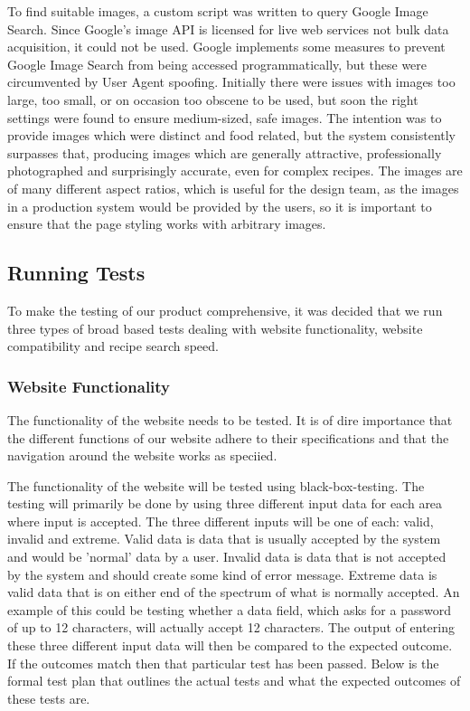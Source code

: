 To find suitable images, a custom script was written to query Google Image Search. Since Google's image API is licensed for live web services not bulk data acquisition, it could not be used. Google implements some measures to prevent Google Image Search from being accessed programmatically, but these were circumvented by User Agent spoofing. Initially there were issues with images too large, too small, or on occasion too obscene to be used, but soon the right settings were found to ensure medium-sized, safe images. The intention was to provide images which were distinct and food related, but the system consistently surpasses that, producing images which are generally attractive, professionally photographed and surprisingly accurate, even for complex recipes. The images are of many different aspect ratios, which is useful for the design team, as the images in a production system would be provided by the users, so it is important to ensure that the page styling works with arbitrary images.



\subsection{Running Tests}                                      %
To make the testing of our product comprehensive, it was decided that we run three types of broad based tests dealing with website functionality, website compatibility and recipe search speed. 

\subsubsection{Website Functionality}
The functionality of the website needs to be tested. It is of dire importance that the different functions of our website adhere to their specifications and that the navigation around the website works as speciied. 

The functionality of the website will be tested using black-box-testing. The testing will primarily be done by using three different input data for each area where input is accepted. The three different inputs will be one of each: valid, invalid and extreme.
Valid data is data that is usually accepted by the system and would be 'normal' data by a user. Invalid data is data that is not accepted by the system and should create some kind of error message. Extreme data is valid data that is on either end of the spectrum of what is normally accepted. An example of this could be testing whether a data field, which asks for a password of up to 12 characters, will actually accept 12 characters. The output of entering these three different input data will then be compared to the expected outcome. If the outcomes match then that particular test has been passed. Below is the formal test plan that outlines the actual tests and what the expected outcomes of these tests are.
 
